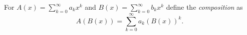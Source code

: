 

\setcounter{section}{2}
\setcounter{subsection}{2}
\setcounter{dfn}{4}

\begin{dfn}
For $A(x) = \sum_{k=0}^\infty a_k x^k$ and $B(x) = \sum_{k=0}^\infty b_k x^k$ define the \emph{composition} as
\[
A(B(x)) = \sum_{k=0}^\infty a_k (B(x))^k.
\]
\end{dfn}


